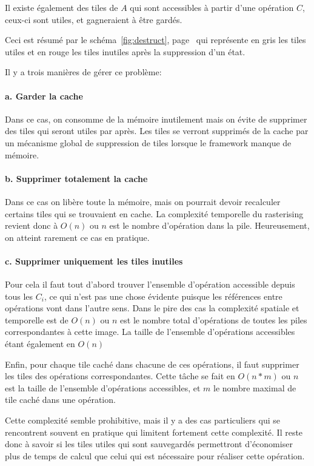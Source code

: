 			Il existe également des tiles de $A$ qui sont accessibles à partir d'une opération $C$, ceux-ci sont utiles, et gagneraient à être
			gardés. 

			Ceci est résumé par le schéma~\ref{fig:destruct}, page~\pageref{fig:destruct} qui représente en gris les tiles utiles et
			en rouge les tiles inutiles après la suppression d'un état.

			Il y a trois manières de gérer ce problème:
			\paragraph{a. Garder la cache}
				Dans ce cas, on consomme de la mémoire inutilement mais on évite de supprimer des tiles qui seront utiles par après.
				Les tiles se verront supprimés de la cache par un mécanisme global de suppression de tiles lorsque le framework manque
				de mémoire.

			\paragraph{b. Supprimer totalement la cache}
				Dans ce cas on libère toute la mémoire, mais on pourrait devoir recalculer certains tiles qui se trouvaient en cache.
				La complexité temporelle du rasterising revient donc à $O(n)$ ou $n$ est le nombre d'opération dans la pile. Heureusement,
				on atteint rarement ce cas en pratique. 

			\paragraph{c. Supprimer uniquement les tiles inutiles}
				Pour cela il faut tout d'abord trouver l'ensemble d'opération accessible depuis tous les $C_i$, ce qui n'est pas une chose 
				évidente puisque les références entre opérations vont dans l'autre sens. Dans le pire des cas la complexité spatiale
				et temporelle est de $O(n)$ ou $n$ est le nombre total d'opérations de toutes les piles correspondantes à cette image.
				La taille de l'ensemble d'opérations accessibles étant également en $O(n)$
				
				Enfin, pour chaque tile caché dans chacune de ces opérations, il faut supprimer les tiles des opérations correspondantes.
				Cette tâche se fait en $O(n*m)$ ou $n$ est la taille de l'ensemble d'opérations accessibles, et $m$ le nombre maximal de
				tile caché dans une opération. 

				Cette complexité semble prohibitive, mais il y a des cas particuliers qui se rencontrent souvent en pratique qui limitent
				fortement cette complexité. Il reste donc à savoir si les tiles utiles qui sont sauvegardés permettront 
				d'économiser plus de temps de calcul que celui qui est nécessaire pour réaliser cette opération. 

